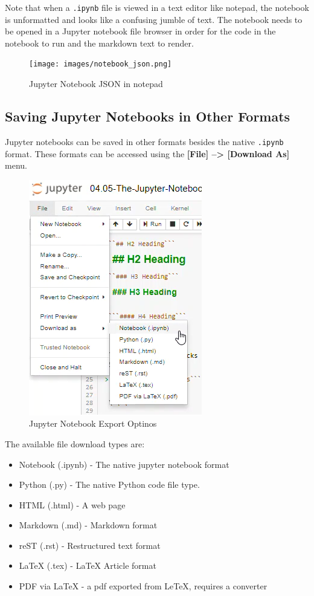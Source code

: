 \documentclass{book}
\makeatletter
\def\maxwidth{\ifdim\Gin@nat@width>\linewidth\linewidth
    \else\Gin@nat@width\fi}
\let\Oldincludegraphics\includegraphics
\renewcommand{\includegraphics}[1]{\Oldincludegraphics[width=.8\maxwidth]{#1}}
\providecommand{\tightlist}{%
      \setlength{\itemsep}{0pt}\setlength{\parskip}{0pt}}
\makeatother
\begin{document}
Note that when a \lstinline!.ipynb! file is viewed in a text editor like
notepad, the notebook is unformatted and looks like a confusing jumble
of text. The notebook needs to be opened in a Jupyter notebook file
browser in order for the code in the notebook to run and the markdown
text to render.

\begin{figure}
\centering
\texttt{[image: images/notebook\_json.png]}
\caption{Jupyter Notebook JSON in notepad}
\end{figure}
    




    
        \subsection{Saving Jupyter Notebooks in Other
Formats}\label{saving-jupyter-notebooks-in-other-formats}

Jupyter notebooks can be saved in other formats besides the native
\lstinline!.ipynb! format. These formats can be accessed using the
\textbf{{[}File{]} --\textgreater{} {[}Download As{]}} menu.

\begin{figure}
\centering
\includegraphics{images/jupyter_notebook_export_options.png}
\caption{Jupyter Notebook Export Optinos}
\end{figure}

The available file download types are:

\begin{itemize}
\tightlist
\item
  Notebook (.ipynb) - The native jupyter notebook format
\item
  Python (.py) - The native Python code file type.
\item
  HTML (.html) - A web page
\item
  Markdown (.md) - Markdown format
\item
  reST (.rst) - Restructured text format
\item
  LaTeX (.tex) - LaTeX Article format
\item
  PDF via LaTeX - a pdf exported from LeTeX, requires a converter
\end{itemize}
\end{document}

